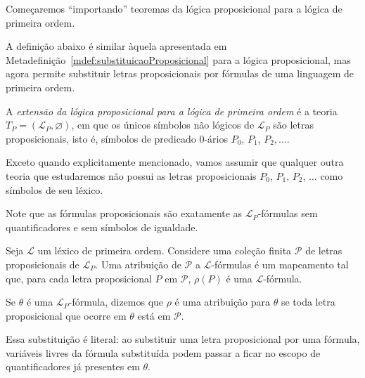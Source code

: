 Começaremos ``importando'' teoremas da lógica proposicional para a lógica de primeira ordem.

A definição abaixo é similar àquela apresentada em Metadefinição~\ref{mdef:substituicaoProposicional} para a lógica proposicional, mas agora permite substituir letras proposicionais por fórmulas de uma linguagem de primeira ordem.

\begin{metadefinition}
    A \emph{extensão da lógica proposicional para a lógica de primeira ordem} é a teoria $T_P=(\mathcal L_P,\varnothing)$, em que os únicos símbolos não lógicos de $\mathcal L_P$ são letras proposicionais, isto é, símbolos de predicado $0$-ários $P_0$, $P_1$, $P_2,\dots$.

    Exceto quando explicitamente mencionado, vamos assumir que qualquer outra teoria que estudaremos não possui as letras proposicionais $P_0$, $P_1$, $P_2$, $\dots$ como símbolos de seu léxico.
\end{metadefinition}

Note que as fórmulas proposicionais são exatamente as $\mathcal L_P$-fórmulas sem quantificadores e sem símbolos de igualdade.
\begin{metadefinition}
   Seja $\mathcal L$ um léxico de primeira ordem.
   Considere uma coleção finita $\mathcal P$ de letras proposicionais de $\mathcal L_P$.
   Uma atribuição de $\mathcal P$ a $\mathcal L$-fórmulas é um mapeamento tal que, para cada letra proposicional $P$ em $\mathcal P$, $\rho(P)$ é uma $\mathcal L$-fórmula.

   Se $\theta$ é uma $\mathcal L_P$-fórmula, dizemos que $\rho$ é uma atribuição para $\theta$ se toda letra proposicional que ocorre em $\theta$ está em $\mathcal P$.
\end{metadefinition}

Essa substituição é literal: ao substituir uma letra proposicional por uma fórmula, variáveis livres da fórmula substituída podem passar a ficar no escopo de quantificadores já presentes em $\theta$.

